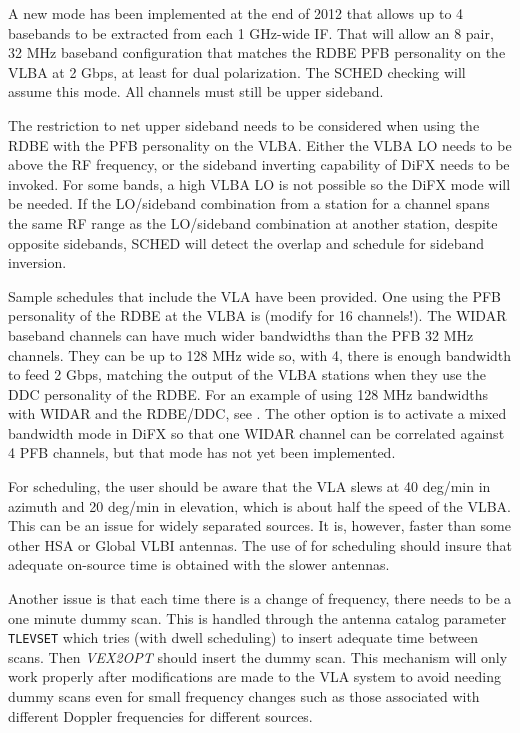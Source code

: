 \documentclass{report}
\begin{document}
A new mode has been implemented at the end of 2012 that allows up to 4
basebands to be extracted from each 1 GHz-wide IF.  That will allow an
8 pair, 32 MHz baseband configuration that matches the RDBE PFB
personality on the VLBA at 2 Gbps, at least for dual polarization.
The SCHED checking will assume this mode.  All channels must still be
upper sideband.

The restriction to net upper sideband needs to be considered when
using the RDBE with the PFB personality on the VLBA.  Either the VLBA
LO needs to be above the RF frequency, or the sideband inverting
capability of DiFX needs to be invoked.  For some bands, a high VLBA
LO is not possible so the DiFX mode will be needed.  If the LO/sideband
combination from a station for a channel spans the same RF range as
the LO/sideband combination at another station, despite opposite
sidebands, SCHED will detect the overlap and schedule for sideband
inversion.

Sample schedules that include the VLA have been provided.  One using
the PFB personality of the RDBE at the VLBA is  (modify for 16 channels!).  The WIDAR
baseband channels can have much wider bandwidths than the PFB 32 MHz
channels.  They can be up to 128 MHz wide so, with 4, there is enough
bandwidth to feed 2 Gbps, matching the output of the VLBA stations
when they use the DDC personality of the RDBE.  For an example of
using 128 MHz bandwidths with WIDAR and the RDBE/DDC, see
.  The other
option is to activate a mixed bandwidth mode in DiFX so that one WIDAR
channel can be correlated against 4 PFB channels, but that mode has
not yet been implemented.

For scheduling, the user should be aware that the VLA slews at 40
deg/min in azimuth and 20 deg/min in elevation, which is about half
the speed of the VLBA.  This can be an issue for widely separated
sources.  It is, however, faster than some other HSA or Global VLBI
antennas.  The use of  for scheduling
should insure that adequate on-source time is obtained with the
slower antennas.

Another issue is that each time there is a change of frequency, there needs
to be a one minute dummy scan.  This is handled through the antenna
catalog parameter {\tt TLEVSET} which tries (with dwell scheduling) to
insert adequate time between scans.  Then {\sl VEX2OPT} should insert
the dummy scan.  This mechanism will only work properly after modifications
are made to the VLA system to avoid needing dummy scans even for small
frequency changes such as those associated with different Doppler 
frequencies for different sources.
\end{document}
